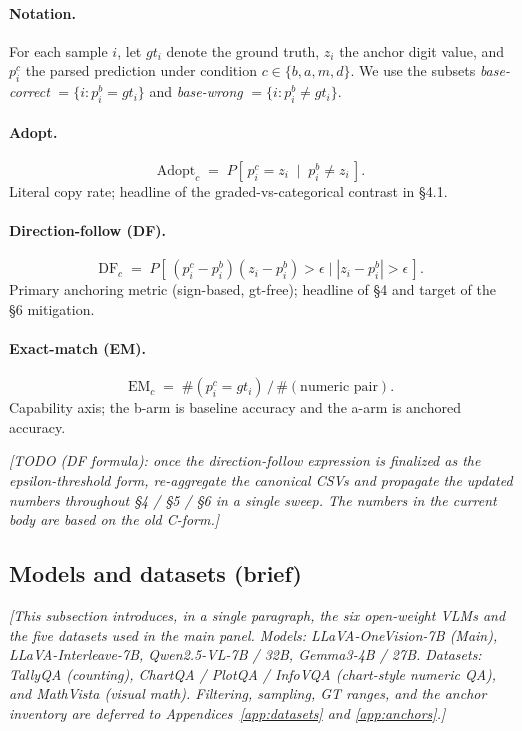\documentclass[11pt]{article}
\newcommand{\todoNote}[1]{\textit{\textcolor[rgb]{0.45,0.45,0.45}{[#1]}}}
\begin{document}
\paragraph{Notation.} For each sample $i$, let $gt_i$ denote the ground truth, $z_i$ the anchor digit value, and $p_i^c$ the parsed prediction under condition $c \in \{b, a, m, d\}$. We use the subsets \emph{base-correct} $= \{i : p_i^b = gt_i\}$ and \emph{base-wrong} $= \{i : p_i^b \neq gt_i\}$.

\paragraph{Adopt.}
\begin{equation*}
  \mathrm{Adopt}_c \;=\; P[\,p_i^c = z_i \;\mid\; p_i^b \neq z_i\,].
\end{equation*}
Literal copy rate; headline of the graded-vs-categorical contrast in \S4.1.

\paragraph{Direction-follow (DF).}
\begin{equation*}
  \mathrm{DF}_c \;=\; P\!\left[\,(p_i^c - p_i^b)(z_i - p_i^b) > \epsilon \;\big|\; |z_i - p_i^b| > \epsilon\,\right].
\end{equation*}
Primary anchoring metric (sign-based, gt-free); headline of \S4 and target of the \S6 mitigation.

\paragraph{Exact-match (EM).}
\begin{equation*}
  \mathrm{EM}_c \;=\; \#(p_i^c = gt_i) \,\big/\, \#(\text{numeric pair}).
\end{equation*}
Capability axis; the b-arm is baseline accuracy and the a-arm is anchored accuracy.

\todoNote{TODO (DF formula): once the direction-follow expression is finalized as the epsilon-threshold form, re-aggregate the canonical CSVs and propagate the updated numbers throughout \S4 / \S5 / \S6 in a single sweep. The numbers in the current body are based on the old C-form.}

\subsection{Models and datasets (brief)}
\todoNote{This subsection introduces, in a single paragraph, the six open-weight VLMs and the five datasets used in the main panel. Models: LLaVA-OneVision-7B (Main), LLaVA-Interleave-7B, Qwen2.5-VL-7B / 32B, Gemma3-4B / 27B. Datasets: TallyQA (counting), ChartQA / PlotQA / InfoVQA (chart-style numeric QA), and MathVista (visual math). Filtering, sampling, GT ranges, and the anchor inventory are deferred to Appendices~\ref{app:datasets} and \ref{app:anchors}.}
\end{document}
